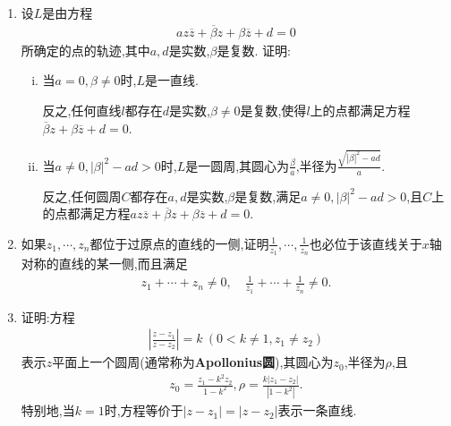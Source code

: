 \documentclass[../../main.tex]{subfiles}%
\begin{document}
\begin{proposition}[复数的几何性质]
\begin{enumerate}[(1)]
\begin{enumerate}[(i)]
\item $z$位于以$z_1$和$z_2$为端点的开圆弧上,当且仅当存在$\theta$ ($0 < |\theta| < \pi$),使得
\begin{align*}
\arg \frac{z - z_1}{z - z_2} = \theta.
\end{align*}
\end{enumerate}

\item\label{proposition:复数的几何性质结论-5} 设$L$是由方程
\begin{align*}
a z\overline{z} + \overline{\beta} z + \beta \overline{z} + d = 0
\end{align*}
所确定的点的轨迹,其中$a,d$是实数,$\beta$是复数. 证明:
\begin{enumerate}[(i)]
\item\label{proposition:复数的几何性质结论-5-1} 当$a=0,\beta\neq0$时,$L$是一直线.

反之,任何直线$l$都存在$d$是实数,$\beta\neq 0$是复数,使得$l$上的点都满足方程$\overline{\beta} z + \beta \overline{z} + d = 0$.

\item\label{proposition:复数的几何性质结论-5-2} 当$a\neq0,|\beta|^2 - ad > 0$时,$L$是一圆周,其圆心为$\frac{\beta}{a}$,半径为$\frac{\sqrt{\left| \beta \right|^2-ad}}{a}.$

反之,任何圆周$C$都存在$a,d$是实数,$\beta$是复数,满足$a\neq 0,|\beta|^2-ad>0$,且$C$上的点都满足方程$a z\overline{z} + \overline{\beta} z + \beta \overline{z} + d = 0$.
\end{enumerate}

\item 如果$z_1,\cdots,z_n$都位于过原点的直线的一侧,证明$\frac{1}{z_1},\cdots,\frac{1}{z_n}$也必位于该直线关于$x$轴对称的直线的某一侧,而且满足
\begin{align*}
z_1+\cdots+z_n\neq0,
\quad
\frac{1}{z_1}+\cdots+\frac{1}{z_n}\neq0.
\end{align*}

\item 证明:方程
\begin{align*}
\left| \frac{z - z_1}{z - z_2} \right| = k \ (0 < k \neq 1, z_1 \neq z_2)
\end{align*}
表示$z$平面上一个圆周(通常称为\textbf{Apollonius圆}),其圆心为$z_0$,半径为$\rho$,且
\begin{align*}
z_0 = \frac{z_1 - k^2 z_2}{1 - k^2}, \rho = \frac{k \left| z_1 - z_2 \right|}{\left| 1 - k^2 \right|}.
\end{align*}
特别地,当$k=1$时,方程等价于$|z-z_1|=|z-z_2|$表示一条直线.


\end{enumerate}
\end{proposition}
\end{document}
